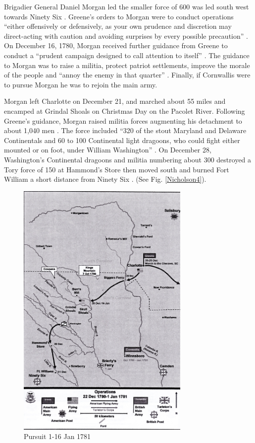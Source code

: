 Brigadier General Daniel Morgan led the smaller force of 600 was led south west
towards Ninety Six \cite[p.27]{weigley_partisan_1970}.  Greene’s orders to Morgan were to
conduct operations “either offensively or defensively, as your own prudence and
discretion may direct-acting with caution and avoiding surprises by every
possible precaution” \cite[p.27]{weigley_partisan_1970}.  On December 16, 1780, Morgan
received further guidance from Greene to conduct a “prudent campaign designed to
call attention to itself” \cite[p.24]{moncure_cowpens_1996}.  The guidance to Morgan was to
raise a militia, protect patriot settlements, improve the morale of the people
and “annoy the enemy in that quarter” \cite[p.24]{moncure_cowpens_1996}.  Finally, if
Cornwallis were to pursue Morgan he was to rejoin the main army.  

Morgan left Charlotte on December 21, and marched about 55 miles and encamped at
Grindal Shoals on Christmas Day on the Pacolet River.  Following Greene’s
guidance, Morgan raised militia forces augmenting his detachment to about 1,040
men \cite[p.28]{weigley_partisan_1970}.   The force included “320 of the stout Maryland and
Delaware Continentals and 60 to 100 Continental light dragoons, who could fight
either mounted or on foot, under William Washington” \cite[p.28]{weigley_partisan_1970}.   On
December 28, Washington’s Continental dragoons and militia numbering about 300
destroyed a Tory force of 150 at Hammond’s Store then moved south and burned
Fort William a short distance from Ninety Six \cite[p.8]{babits_devil_2001}.
(See Fig. \ref{Nicholson4}).


\begin{figure}[h]
\begin{center}
\includegraphics[height=5in]{gfx/Nicholson5}
\end{center}
\caption{Pursuit 1-16 Jan 1781 \cite[Tab D, Map 7]{rauch_battle_2007}}
\label{Nicholson5}
\end{figure}

